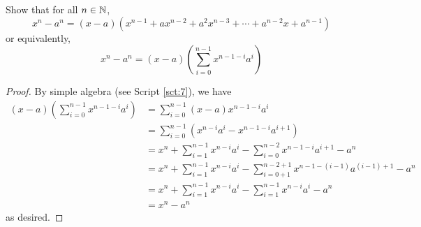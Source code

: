 \documentclass[../main.tex]{subfiles}
\begin{document}
\begin{exercise}\label{exr:12.7}
    Show that for all $n\in\mathbb{N}$,
    \begin{equation*}
        x^n-a^n = (x-a)\left( x^{n-1}+ax^{n-2}+a^2x^{n-3}+\cdots+a^{n-2}x+a^{n-1} \right)
    \end{equation*}
    or equivalently,
    \begin{equation*}
        x^n-a^n = (x-a)\left( \sum_{i=0}^{n-1}x^{n-1-i}a^i \right)
    \end{equation*}
    \begin{proof}
        By simple algebra (see Script \ref{sct:7}), we have
        \begin{align*}
            (x-a)\left( \sum_{i=0}^{n-1}x^{n-1-i}a^i \right) &= \sum_{i=0}^{n-1}(x-a)x^{n-1-i}a^i\\
            &= \sum_{i=0}^{n-1}\left( x^{n-i}a^i-x^{n-1-i}a^{i+1} \right)\\
            &= x^n+\sum_{i=1}^{n-1}x^{n-i}a^i-\sum_{i=0}^{n-2}x^{n-1-i}a^{i+1}-a^n\\
            &= x^n+\sum_{i=1}^{n-1}x^{n-i}a^i-\sum_{i=0+1}^{n-2+1}x^{n-1-(i-1)}a^{(i-1)+1}-a^n\\
            &= x^n+\sum_{i=1}^{n-1}x^{n-i}a^i-\sum_{i=1}^{n-1}x^{n-i}a^i-a^n\\
            &= x^n-a^n
        \end{align*}
        as desired.
    \end{proof}
\end{exercise}
\end{document}
